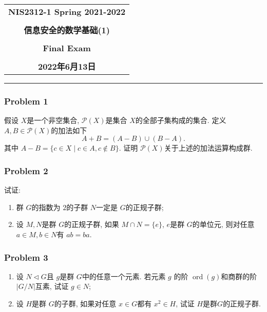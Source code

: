 \documentclass[a4paper,12pt]{ctexart}
\begin{document}
  \begin{center}

  \vspace{-0.3in}
  \begin{tabular}{c}
    \textbf{\Large NIS2312-1 Spring 2021-2022} \\
    \textbf{\Large  } \\
    \textbf{\Large  信息安全的数学基础(1)} \\
    \textbf{\Large  } \\
    \textbf{\Large  Final Exam} \\
    \textbf{\Large  } \\
    \textbf{\Large 2022年6月13日} \\
  \end{tabular}
  \end{center}
  \noindent
  \rule{\linewidth}{0.4pt}

\subsubsection*{Problem 1}
    假设 $ X $是一个非空集合, $ \mathcal{P}(X) $是集合 $ X $的全部子集构成的集合. 定义 $ A,B\in\mathcal{P}(X) $的加法如下
    \[A+B=(A-B)\cup(B-A).\]
    其中 $ A-B=\{c\in X\mid c\in A,c\notin B\} $. 证明 $ \mathcal{P}(X) $关于上述的加法运算构成群.
\subsubsection*{Problem 2}
    试证:
    \begin{enumerate}
      \item 群 $ G $的指数为 $ 2 $的子群 $ N $一定是 $ G $的正规子群;
      \item 设 $ M,N $是群 $ G $的正规子群, 如果 $ M\cap N=\{e\} $, $ e $是群 $ G $的单位元, 则对任意 $ a\in M,b\in N $有 $ ab=ba $.
    \end{enumerate}
\subsubsection*{Problem 3}
    \begin{enumerate}
      \item 设 $ N\triangleleft G $且 $ g $是群 $ G $中的任意一个元素. 若元素 $ g $ 的阶 $ \operatorname{ord}(g) $和商群的阶 $ |G/N| $互素, 试证 $ g\in N $;
      \item 设 $ H $是群 $ G $的子群, 如果对任意 $ x\in G $都有 $ x^2\in H $, 试证 $ H $是群$ G $的正规子群.
    \end{enumerate}
\end{document}
